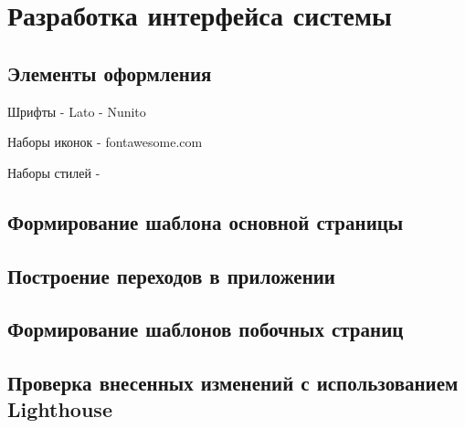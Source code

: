 \section{Разработка интерфейса системы}

\subsection{Элементы оформления}
Шрифты
- Lato
- Nunito

Наборы иконок
- fontawesome.com

Наборы стилей
-

\subsection{Формирование шаблона основной страницы}

\subsection{Построение переходов в приложении}

\subsection{Формирование шаблонов побочных страниц}


\subsection{Проверка внесенных изменений с использованием Lighthouse}


\clearpage
